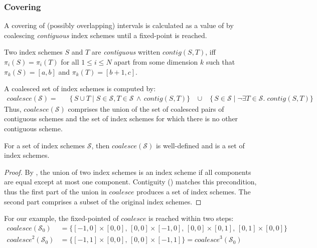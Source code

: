 \subsubsection{Covering}
A covering of (possibly overlapping) intervals is calculated as a
value of  by coalescing \emph{contiguous} index schemes
until a fixed-point is reached.

\newcommand{\contig}[2]{\mathit{contig}(#1, #2)}
\begin{defn}[Contiguity]
  \label{def:contiguity}
  Two index schemes $S$ and $T$ are \emph{contiguous} written
  $\contig{S}{T}$, iff $\pi_i(S) = \pi_i(T)$ for all $1 \leq i \leq N$
  apart from some dimension $k$ such that $\pi_k(S) = [a, b]$ and
  $\pi_k(T) = [b+1, c]$.
\end{defn}
%
A coalesced set of index schemes is computed by:%
%
\begin{align*}
  \mathit{coalesce}(\mathcal{S}) = \; & \;\;
  \{\,S \cup T \mid S \in \mathcal{S}, T \in \mathcal{S} \, \wedge \,
                                        \contig{S}{T} \}
  \;\;\; \cup \;\;\;
  \{\,S \in \mathcal{S} \mid \neg \exists T \in \mathcal{S} . \; \contig{S}{T}\}
\end{align*}
%
Thus, $\mathit{coalesce}(\mathcal{S})$
comprises the union of the set of coalesced pairs of contiguous
schemes and the set of index schemes for which there is no other
contiguous scheme.
%
\begin{lemma}[Closure]
  For a set of index schemes $\mathcal{S}$, then
  $\mathit{coalesce}(\mathcal{S})$ is well-defined and is a set of
  index schemes.
\end{lemma}
\begin{proof}
  By , the union of two index schemes is an
  index scheme if all components are equal except at most one
  component. Contiguity () matches
  this precondition, thus the first part of the union in
  $\mathit{coalesce}$ produces a set of index schemes. The second part
  comprises a subset of the original index schemes.
\end{proof}
%
For our example, the fixed-pointed of $\mathit{coalesce}$ is reached within two
steps:
%
\begin{align*}
  \mathit{coalesce}(\mathcal{S}_0) & =
  \{[-1,0] \times [0,0],\,[0,0] \times [-1, 0],\,[0,0] \times
    [0,1],\,[0,1] \times [0,0]\} \\
  \mathit{coalesce}^2(\mathcal{S}_0) & =
  \{[-1, 1] \times [0, 0],\,[0, 0] \times [-1, 1]\} = \mathit{coalesce}^3(\mathcal{S}_0)
\end{align*}
%

